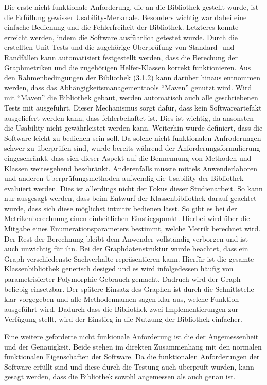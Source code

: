 \documentclass[a4paper,12pt,ngerman,chapterprefix=false,listof=totoc,bibliography=totoc]{scrreprt}
\begin{document}
{{{Die erste nicht funktionale Anforderung, die an die Bibliothek gestellt wurde, ist die Erfüllung gewisser Usability-Merkmale. Besonders wichtig war dabei eine einfache Bedienung und die Fehlerfreiheit der Bibliothek. Letzteres konnte erreicht werden, indem die Software ausführlich getestet wurde. Durch die erstellten Unit-Tests und die zugehörige Überprüfung von Standard- und Randfällen kann automatisiert festgestellt werden, dass die Berechung der Graphmetriken und die zugehörigen Helfer-Klassen korrekt funktionieren. Aus den Rahmenbedingungen der Bibliothek (3.1.2) kann darüber hinaus entnommen werden, dass das Abhängigkeitsmanagementtools "`Maven"' genutzt wird. Wird mit "`Maven"' die Bibliothek gebaut, werden automatisch auch alle geschriebenen Tests mit ausgeführt. Dieser Mechanismus sorgt dafür, dass kein Softwareartefakt ausgeliefert werden kann, dass fehlerbehaftet ist. Dies ist wichtig, da ansonsten die Usability nicht gewährleistet werden kann. Weiterhin wurde definiert, dass die Software leicht zu bedienen sein soll. Da solche nicht funktionalen Anfroderungen schwer zu überprüfen sind, wurde bereits während der Anforderungsformulierung eingeschränkt, dass sich dieser Aspekt auf die Bennennung von Methoden und Klassen weitesgehend beschränkt. Anderenfalls müsste mittels Anwenderlaboren und anderen Überprüfungsmethoden aufwendig die Usability der Bibliothek evaluiert werden. Dies ist allerdings nicht der Fokus dieser Studienarbeit. So kann nur ausgesagt werden, dass beim Entwurf der Klassenbibliothek darauf geachtet wurde, dass sich diese möglichst intuitiv bedienen lässt. So gibt es bei der Metrikenberechnung einen einheitlichen Einstiegspunkt. Hierbei wird über die Mitgabe eines Enumerationsparameters bestimmt, welche Metrik berechnet wird. Der Rest der Berechnung bleibt dem Anwender vollständig verborgen und ist auch unwichtig für ihn. Bei der Graphdatenstruktur wurde beachtet, dass ein Graph verschiedenste Sachverhalte repräsentieren kann. Hierfür ist die gesamte Klassenbibliothek generisch desiged und es wird infolgedessen häufig von parametrisierter Polymorphie Gebrauch gemacht. Dadruch wird der Graph beliebig einsetzbar. Der spätere Einsatz des Graphen ist durch die Schnittstelle klar vorgegeben und alle Methodennamen sagen klar aus, welche Funktion ausgeführt wird. Dadurch dass die Bibliothek zwei Implementierungen zur Verfügung stellt, wird der Einstieg in die Nutzung der Bibliothek einfacher.

Eine weitere geforderte nicht funkionale Anforderung ist die der Angemessenheit und der Genauigkeit. Beide stehen im direkten Zusammenhang mit den normalen funktionalen Eigenschaften der Software. Da die funktionalen Anforderungen der Software erfüllt sind und diese durch die Testung auch überprüft wurden, kann gesagt werden, dass die Bibliothek sowohl angemessen als auch genau ist.

}}}
\end{document}
